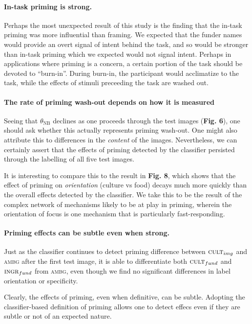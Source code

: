 \documentclass[a4paper]{report}
\begin{document}
\paragraph{In-task priming is strong.}  Perhaps the most unexpected result of 
this study is the finding that the in-task priming was more influential than
framing.  We expected that the funder names would provide an overt signal of 
intent behind the task, and so would be stronger than in-task priming which 
we expected would not signal intent.  Perhaps in applications where priming 
is a concern, a certain portion of the task should be devoted to  
``burn-in''.  During burn-in, the participant would acclimatize to the task, 
while the effects of stimuli preceeding the task are washed out.

\paragraph{The rate of priming wash-out depends on how it is measured}
Seeing that $\theta_\text{NB}$ declines as one proceeds through the test 
images (\textbf{Fig. 6}), one should ask whether this actually represents 
priming wash-out.  One might also attribute this to 
differences in the \textit{content} of the images.  Nevertheless, we can
certainly assert that the effects of priming detected by the classifier 
persisted through the labelling of all five test images.  

It is interesting to compare this to the result in \textbf{Fig. 8}, which
shows that the effect of priming on \textit{orientation} (culture vs food) 
decays much more quickly than the overall effects detected by
the classifier.  We take this to be the result of the complex network of 
mechanisms likely to be at play in priming, wherein the orientation of focus
is one mechanism that is particularly fast-responding.


\paragraph{Priming effects can be subtle even when strong.}
Just as the classifier continues to detect priming difference between 
$\textsc{cult}_{img}$ and \textsc{ambg} after the first test image,
it is able to differentiate both $\textsc{cult}_{fund}$ and 
$\textsc{ingr}_{fund}$ from \textsc{ambg}, even though we find no significant
differences in label orientation or specificity.  

Clearly, the effects of
priming, even when definitive, can be subtle. Adopting the classifier-based
definition of priming allows one to detect effecs even if they are subtle or
not of an expected nature.
\end{document}
